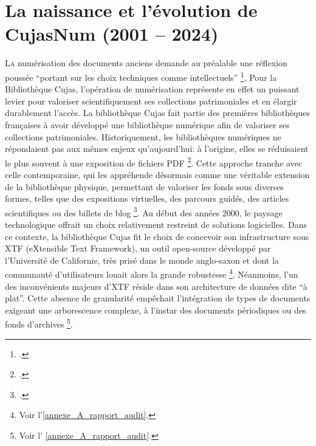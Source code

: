 \chapter{La naissance et l’évolution de CujasNum (2001 – 2024)}

\lettrine{L}a numérisation des documents anciens demande au préalable une réflexion poussée \enquote{portant sur les choix techniques comme intellectuels} \footcite{joannic-setaEtudePrealableOperation1999}. Pour la Bibliothèque Cujas, l'opération de numérisation représente en effet un puissant levier pour valoriser scientifiquement ses collections patrimoniales et en élargir durablement l'accès. La bibliothèque Cujas fait partie des premières bibliothèques françaises à avoir développé une bibliothèque numérique afin de valoriser ses collections patrimoniales. Historiquement, les bibliothèques numériques ne répondaient pas aux mêmes enjeux qu'aujourd'hui: à l'origine, elles se réduisaient le plus souvent à une exposition de fichiers PDF \footcite{dipietroProduireContenusDocumentaires2014}. Cette approche tranche avec celle contemporaine, qui les appréhende désormais comme une véritable extension de la bibliothèque physique, permettant de valoriser les fonds sous diverses formes, telles que des expositions virtuelles, des parcours guidés, des articles scientifiques ou des billets de blog \footcite{bermesWebSemantiqueBibliotheque2013}. Au début des années 2000, le paysage technologique offrait un choix relativement restreint de solutions logicielles. Dans ce contexte, la bibliothèque Cujas fit le choix de concevoir son infrastructure sous XTF (eXtensible Text Framework), un outil open-source développé par l'Université de Californie, très prisé dans le monde anglo-saxon et dont la communauté d'utilisateurs louait alors la grande robustesse \footnote{Voir l'\ref{annexe_A_rapport_audit}.}. Néanmoins, l'un des inconvénients majeurs d'XTF réside dans son architecture de données dite \enquote{à plat}. Cette absence de granularité empêchait l'intégration de types de documents exigeant une arborescence complexe, à l'instar des documents périodiques ou des fonds d'archives \footnote{Voir l' \ref{annexe_A_rapport_audit}.}.




